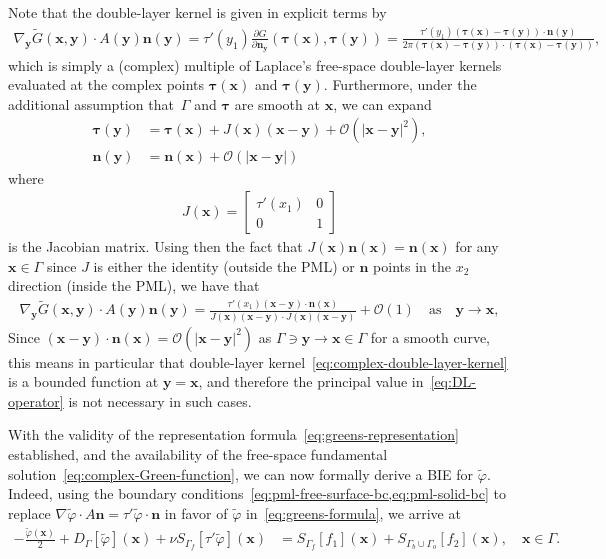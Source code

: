 \documentclass[review,hidelinks,onefignum,onetabnum]{siamart220329}
\newcommand{\bn}{\mathbf{n}}
\newcommand{\bx}{\mathbf{x}}
\newcommand{\btau}{\boldsymbol{\tau}}
\newcommand{\by}{\mathbf{y}}
\newcommand{\tvarphi}{\widetilde \varphi}
\begin{document}
Note that the double-layer kernel is given in explicit terms by
\begin{align}
  \label{eq:complex-double-layer-kernel}
\nabla_{\by}\widetilde{G}(\bx,\by) \cdot A(\by)\bn(\by) = \tau'(y_1)\frac{\partial G}{\partial\bn_{\by}}(\btau(\bx),\btau(\by)) = \frac{\tau'(y_1)(\btau(\bx)-\btau(\by)) \cdot \bn(\by)}{2\pi (\btau(\bx) - \btau(\by)) \cdot (\btau(\bx) - \btau(\by))},
\end{align}
which is simply a (complex) multiple of Laplace's free-space double-layer kernels evaluated at the complex points $\btau(\bx)$ and $\btau(\by)$. Furthermore, under the additional assumption that~$\Gamma$ and $\btau$ are smooth at $\bx$, we can expand
\begin{align}
\btau(\by) &= \btau(\bx) + J(\bx) (\bx - \by) + \mathcal{O}(|\bx - \by|^2), \\
\bn(\by) &= \bn(\bx) + \mathcal{O}(|\bx - \by|)
\end{align}
where 
\begin{align}
    J(\bx) = \begin{bmatrix}
        \tau'(x_1) & 0\\
        0     & 1
    \end{bmatrix}
\end{align}
is the Jacobian matrix. Using then the fact that $J(\bx) \bn(\bx) = \bn(\bx)$ for any $\bx \in \Gamma$ since $J$ is either the identity (outside the PML) or $\bn$ points in the $x_2$ direction (inside the PML), we have that
\begin{align}
\nabla_{\by}\widetilde{G}(\bx,\by) \cdot A(\by)\bn(\by) = \frac{\tau'(x_1) (\bx - \by) \cdot \bn(\bx)}{J(\bx)(\bx - \by)\cdot J(\bx)(\bx - \by)} + \mathcal{O}(1) \quad \mbox{as} \quad \by \to \bx,
\end{align}
Since $(\bx - \by) \cdot \bn(\bx) = \mathcal{O}(|\bx - \by|^2)$ as $\Gamma \ni \by \to \bx \in \Gamma$ for a smooth curve, this means in particular that double-layer kernel~\cref{eq:complex-double-layer-kernel} is a bounded function at $\by = \bx$, and therefore the principal value in~\cref{eq:DL-operator} is not necessary in such cases. 

With the validity of the representation formula~\cref{eq:greens-representation}
established, and the availability of the free-space fundamental solution~\cref{eq:complex-Green-function}, we can
now formally derive a BIE for $\tvarphi$. Indeed, using the boundary conditions~\cref{eq:pml-free-surface-bc,eq:pml-solid-bc} to replace
$\nabla \tvarphi \cdot A \bn = \tau' \tvarphi \cdot \bn$ in favor of $\tvarphi$ in~\cref{eq:greens-formula}, we arrive at 
%
\begin{align}
  \label{eq:BIE-long}
  -\frac{\tvarphi(\bx)}{2} + D_{\Gamma}[\tvarphi](\bx) + \nu S_{\Gamma_f}\left[\tau'\tvarphi\right](\bx) &= S_{\Gamma_f}[f_1](\bx) + S_{\Gamma_b \cup \Gamma_o}[f_2](\bx), \quad \bx \in \Gamma.
\end{align}
%
\end{document}
